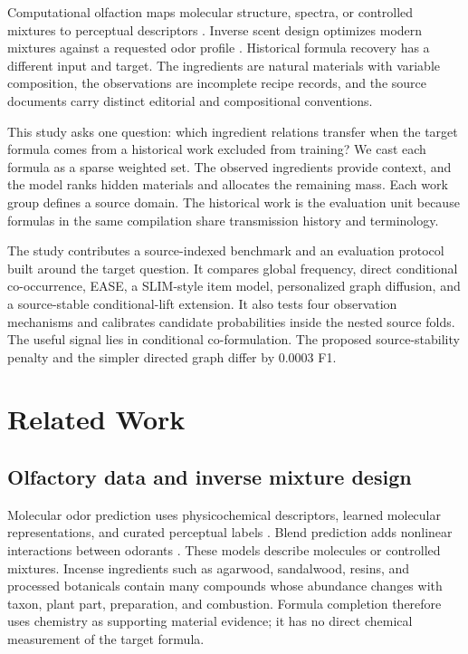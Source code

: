 \documentclass[11pt,a4paper]{article}
\begin{document}
Computational olfaction maps molecular structure, spectra, or controlled mixtures to perceptual descriptors \citep{keller2017_dream,gutierrez2018_semantic,lee2023_pom,sisson2025_blends}. Inverse scent design optimizes modern mixtures against a requested odor profile \citep{aleixandre2024_scent_creation}. Historical formula recovery has a different input and target. The ingredients are natural materials with variable composition, the observations are incomplete recipe records, and the source documents carry distinct editorial and compositional conventions.

This study asks one question: which ingredient relations transfer when the target formula comes from a historical work excluded from training? We cast each formula as a sparse weighted set. The observed ingredients provide context, and the model ranks hidden materials and allocates the remaining mass. Each work group defines a source domain. The historical work is the evaluation unit because formulas in the same compilation share transmission history and terminology.

The study contributes a source-indexed benchmark and an evaluation protocol built around the target question. It compares global frequency, direct conditional co-occurrence, EASE, a SLIM-style item model, personalized graph diffusion, and a source-stable conditional-lift extension. It also tests four observation mechanisms and calibrates candidate probabilities inside the nested source folds. The useful signal lies in conditional co-formulation. The proposed source-stability penalty and the simpler directed graph differ by 0.0003 F1.

\section{Related Work}

\subsection{Olfactory data and inverse mixture design}

Molecular odor prediction uses physicochemical descriptors, learned molecular representations, and curated perceptual labels \citep{keller2017_dream,gutierrez2018_semantic,lee2023_pom,hamel2024_pyrfume}. Blend prediction adds nonlinear interactions between odorants \citep{sisson2025_blends,thomasdanguin2014_mixtures}. These models describe molecules or controlled mixtures. Incense ingredients such as agarwood, sandalwood, resins, and processed botanicals contain many compounds whose abundance changes with taxon, plant part, preparation, and combustion. Formula completion therefore uses chemistry as supporting material evidence; it has no direct chemical measurement of the target formula.
\end{document}
